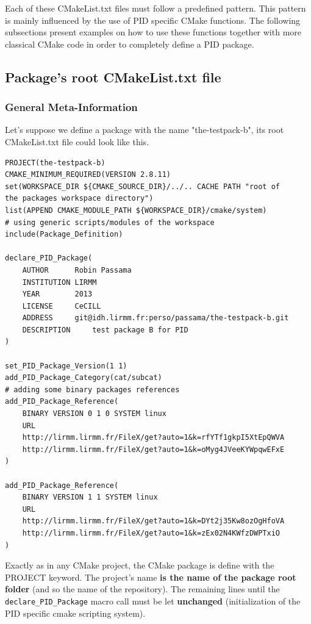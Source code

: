 \documentclass[12pt,a4paper]{article}
\begin{document}
Each of these CMakeList.txt files must follow a predefined pattern. This pattern is mainly influenced by the use of PID specific CMake functions. The following subsections present examples on how to use these functions together with more classical CMake code in order to completely define a PID package.

\subsection{Package's root CMakeList.txt file}
\label{sec:rootCMake}

\subsubsection{General Meta-Information}
\label{sec:rootCMakeGeneral}

Let's suppose we define a package with the name "the-testpack-b", its root CMakeList.txt file could look like this.

\begin{verbatim}
PROJECT(the-testpack-b)
CMAKE_MINIMUM_REQUIRED(VERSION 2.8.11)
set(WORKSPACE_DIR ${CMAKE_SOURCE_DIR}/../.. CACHE PATH "root of 
the packages workspace directory")
list(APPEND CMAKE_MODULE_PATH ${WORKSPACE_DIR}/cmake/system) 
# using generic scripts/modules of the workspace
include(Package_Definition)

declare_PID_Package(	
    AUTHOR      Robin Passama 
    INSTITUTION LIRMM 
    YEAR        2013 
    LICENSE     CeCILL
    ADDRESS     git@idh.lirmm.fr:perso/passama/the-testpack-b.git
    DESCRIPTION 	test package B for PID
)

set_PID_Package_Version(1 1)
add_PID_Package_Category(cat/subcat)
# adding some binary packages references
add_PID_Package_Reference(
    BINARY VERSION 0 1 0 SYSTEM linux 
    URL 	
    http://lirmm.lirmm.fr/FileX/get?auto=1&k=rfYTf1gkpI5XtEpQWVA		
    http://lirmm.lirmm.fr/FileX/get?auto=1&k=oMyg4JVeeKYWpqwEFxE
)

add_PID_Package_Reference(	
    BINARY VERSION 1 1 SYSTEM linux 
    URL 
    http://lirmm.lirmm.fr/FileX/get?auto=1&k=DYt2j35Kw8ozOgHfoVA
    http://lirmm.lirmm.fr/FileX/get?auto=1&k=zEx02N4KWfzDWPTxiO
)
\end{verbatim}

Exactly as in any CMake project, the CMake package is define with the PROJECT keyword. The project's name \textbf{is the name of the package root folder} (and so the name of the repository). The remaining lines until the \texttt{declare\_PID\_Package} macro call must be let \textbf{unchanged} (initialization of the PID specific cmake scripting system).
\end{document}
